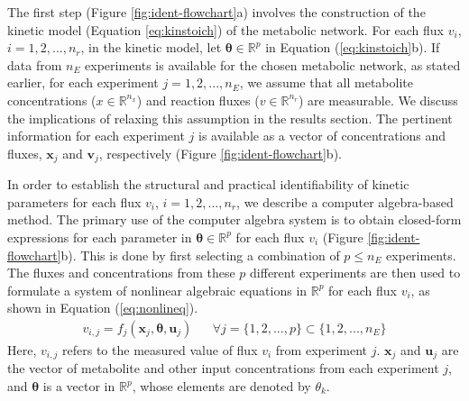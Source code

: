 \documentclass[10pt]{article}
\begin{document}
	The first step (Figure \ref{fig:ident-flowchart}a) involves the construction of the kinetic model (Equation \ref{eq:kinstoich}) of the metabolic network. For each flux $v_i$, $i={1, 2, ..., n_r}$, in the kinetic model, let $\mathbf{\theta} \in \mathbb{R}^{p}$ in Equation (\ref{eq:kinstoich}b). If data from $n_E$ experiments is available for the chosen metabolic network, as stated earlier, for each experiment $j = {1, 2, ..., n_E}$, we assume that all metabolite concentrations ($x\in\mathbb{R}^{n_x}$) and reaction fluxes ($v\in\mathbb{R}^{n_r}$) are measurable. We discuss the implications of relaxing this assumption in the results section. The pertinent information for each experiment $j$ is available as a vector of concentrations and fluxes, $\mathbf{x}_j$ and $\mathbf{v}_j$, respectively (Figure \ref{fig:ident-flowchart}b). 
	
	In order to establish the structural and practical identifiability of kinetic parameters for each flux $v_i$, $i={1, 2, ..., n_r}$, we describe a computer algebra-based method. The primary use of the computer algebra system is to obtain closed-form expressions for each parameter in $\mathbf{\theta} \in \mathbb{R}^p$ for each flux $v_i$ (Figure \ref{fig:ident-flowchart}b). This is done by first selecting a combination of $p\le n_E$ experiments. The fluxes and concentrations from these $p$ different experiments are then used to formulate a system of nonlinear algebraic equations in $\mathbb{R}^{p}$ for each flux $v_i$, as shown in Equation (\ref{eq:nonlineq}). 
	\begin{align}\label{eq:nonlineq}
	v_{i, j} = f_j(\mathbf{x}_j,\mathbf{\theta}, \mathbf{u}_j) && \forall j=\{1, 2, ..., p\}\subset\{1, 2, ..., n_E\}
	\end{align}
	Here, $v_{i,j}$ refers to the measured value of flux $v_i$ from experiment $j$. $\mathbf{x}_j$ and $\mathbf{u}_j$ are the vector of metabolite and other input concentrations from each experiment $j$, and $\mathbf{\theta}$ is a vector in $\mathbb{R}^{p}$, whose elements are denoted by $\theta_k$.		
	
\end{document}
